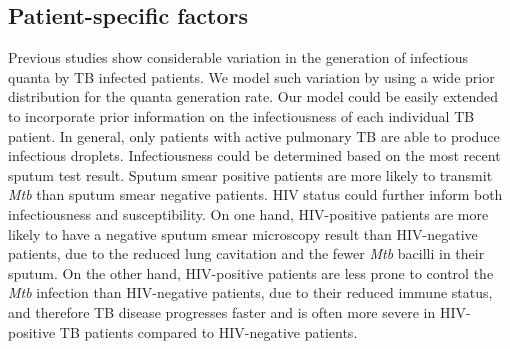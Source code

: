 \documentclass[fleqn,11pt]{wlscirep_supp}
\begin{document}
\subsection{Patient-specific factors}

Previous studies show considerable variation in the generation of infectious quanta by TB infected patients\cite{Escombe2008PLoSMed,Andrews2014JID}. We model such variation by using a wide prior distribution for the quanta generation rate. Our model could be easily extended to incorporate prior information on the infectiousness of each individual TB patient. In general, only patients with active pulmonary TB are able to produce infectious droplets\cite{Rieder1999}. Infectiousness could be determined based on the most recent sputum test result. Sputum smear positive patients are more likely to transmit \emph{Mtb} than sputum smear negative patients\cite{Shaw1954ART,Brindle1993AMRRD,Grzybowski1975BIUT}. HIV status could further inform both infectiousness and susceptibility. On one hand, HIV-positive patients are more likely to have a negative sputum smear microscopy result than HIV-negative patients, due to the reduced lung cavitation and the fewer \emph{Mtb} bacilli in their sputum\cite{Brindle1993AMRRD,Telzak1997CID}. On the other hand, HIV-positive patients are less prone to control the \emph{Mtb} infection than HIV-negative patients, due to their reduced immune status\cite{Forte1992AIDS,Kwan2011CMR,Shen1988CEI}, and therefore TB disease progresses faster and is often more severe in HIV-positive TB patients compared to HIV-negative patients. 



\clearpage


\end{document}
